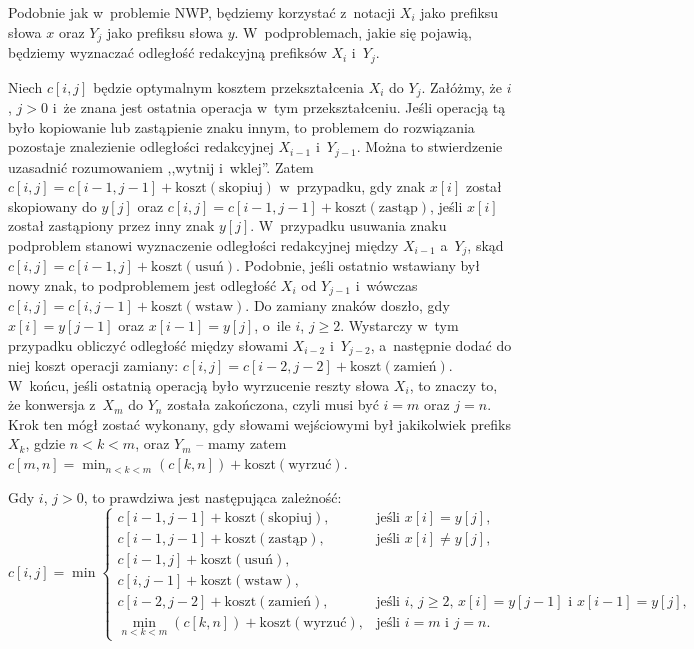 
\subproblem %
Podobnie jak w~problemie NWP, będziemy korzystać z~notacji $X_i$ jako  prefiksu słowa $x$ oraz $Y_j$ jako  prefiksu słowa $y$.
W~podproblemach, jakie się pojawią, będziemy wyznaczać odległość redakcyjną prefiksów $X_i$ i~$Y_j$.

Niech $c[i,j]$ będzie optymalnym kosztem przekształcenia $X_i$ do $Y_j$.
Załóżmy, że $i$, $j>0$ i~że znana jest ostatnia operacja w~tym przekształceniu.
Jeśli operacją tą było kopiowanie lub zastąpienie znaku innym, to problemem do rozwiązania pozostaje znalezienie odległości redakcyjnej $X_{i-1}$ i~$Y_{j-1}$.
Można to stwierdzenie uzasadnić rozumowaniem ,,wytnij i~wklej''.
Zatem $c[i,j]=c[i-1,j-1]+\mathrm{koszt}(\text{skopiuj})$ w~przypadku, gdy znak $x[i]$ został skopiowany  do $y[j]$ oraz $c[i,j]=c[i-1,j-1]+\mathrm{koszt}(\text{zastąp})$, jeśli $x[i]$ został zastąpiony przez inny znak $y[j]$.
W~przypadku usuwania znaku podproblem stanowi wyznaczenie odległości redakcyjnej między $X_{i-1}$ a~$Y_j$, skąd $c[i,j]=c[i-1,j]+\mathrm{koszt}(\text{usuń})$.
Podobnie, jeśli ostatnio wstawiany był nowy znak, to podproblemem jest odległość $X_i$ od $Y_{j-1}$ i~wówczas $c[i,j]=c[i,j-1]+\mathrm{koszt}(\text{wstaw})$.
Do zamiany znaków doszło, gdy $x[i]=y[j-1]$ oraz $x[i-1]=y[j]$, o~ile $i$, $j\ge2$.
Wystarczy w~tym przypadku obliczyć odległość między słowami $X_{i-2}$ i~$Y_{j-2}$, a~następnie dodać do niej koszt operacji zamiany: $c[i,j]=c[i-2,j-2]+\mathrm{koszt}(\text{zamień})$.
W~końcu, jeśli ostatnią operacją było wyrzucenie reszty słowa $X_i$, to znaczy to, że konwersja z~$X_m$ do $Y_n$ została zakończona, czyli musi być $i=m$ oraz $j=n$.
Krok ten mógł zostać wykonany, gdy słowami wejściowymi był jakikolwiek prefiks $X_k$, gdzie $n<k<m$, oraz $Y_m$ -- mamy zatem $c[m,n]=\min_{n<k<m}(c[k,n])+\mathrm{koszt}(\text{wyrzuć})$.

Gdy $i$, $j>0$, to prawdziwa jest następująca zależność:
\[
	c[i,j] = \min\begin{cases}
		c[i-1,j-1]+\mathrm{koszt}(\text{skopiuj}), & \text{jeśli $x[i]=y[j]$}, \\
		c[i-1,j-1]+\mathrm{koszt}(\text{zastąp}), & \text{jeśli $x[i]\ne y[j]$}, \\
		c[i-1,j]+\mathrm{koszt}(\text{usuń}), \\
		c[i,j-1]+\mathrm{koszt}(\text{wstaw}), \\
		c[i-2,j-2]+\mathrm{koszt}(\text{zamień}), & \text{jeśli $i$, $j\ge2$, $x[i]=y[j-1]$ i~$x[i-1]=y[j]$}, \\
		\displaystyle\min_{n<k<m}(c[k,n])+\mathrm{koszt}(\text{wyrzuć}), & \text{jeśli $i=m$ i~$j=n$}.
	\end{cases}
\]

